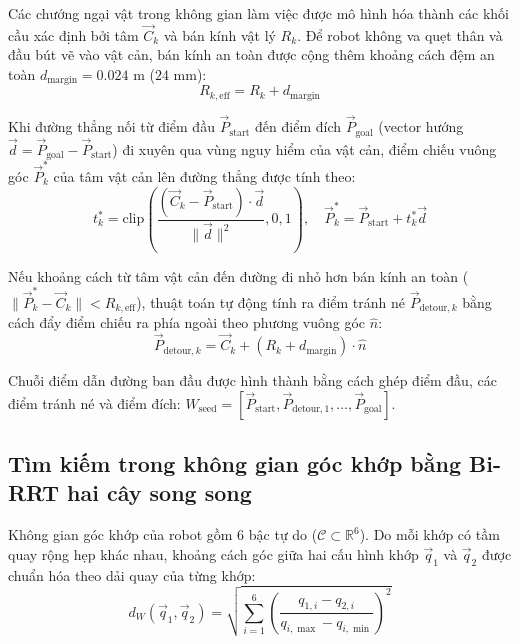 Các chướng ngại vật trong không gian làm việc được mô hình hóa thành các khối cầu xác định bởi tâm $\vec{C}_k$ và bán kính vật lý $R_k$. Để robot không va quẹt thân và đầu bút vẽ vào vật cản, bán kính an toàn được cộng thêm khoảng cách đệm an toàn $d_{\text{margin}} = 0.024\text{ m}$ ($24\text{ mm}$):
\begin{equation}
    R_{k,\text{eff}} = R_k + d_{\text{margin}}
\end{equation}

Khi đường thẳng nối từ điểm đầu $\vec{P}_{\text{start}}$ đến điểm đích $\vec{P}_{\text{goal}}$ (vector hướng $\vec{d} = \vec{P}_{\text{goal}} - \vec{P}_{\text{start}}$) đi xuyên qua vùng nguy hiểm của vật cản, điểm chiếu vuông góc $\vec{P}_k^*$ của tâm vật cản lên đường thẳng được tính theo:
\begin{equation}
    t_k^* = \text{clip}\left( \frac{(\vec{C}_k - \vec{P}_{\text{start}}) \cdot \vec{d}}{\|\vec{d}\|^2}, 0, 1 \right), \quad \vec{P}_k^* = \vec{P}_{\text{start}} + t_k^* \vec{d}
\end{equation}

Nếu khoảng cách từ tâm vật cản đến đường đi nhỏ hơn bán kính an toàn ($\|\vec{P}_k^* - \vec{C}_k\| < R_{k,\text{eff}}$), thuật toán tự động tính ra điểm tránh né $\vec{P}_{\text{detour},k}$ bằng cách đẩy điểm chiếu ra phía ngoài theo phương vuông góc $\hat{n}$:
\begin{equation}
    \vec{P}_{\text{detour},k} = \vec{C}_k + (R_k + d_{\text{margin}}) \cdot \hat{n}
\end{equation}

Chuỗi điểm dẫn đường ban đầu được hình thành bằng cách ghép điểm đầu, các điểm tránh né và điểm đích: $W_{\text{seed}} = [\vec{P}_{\text{start}}, \vec{P}_{\text{detour},1}, \dots, \vec{P}_{\text{goal}}]$.

\subsection{Tìm kiếm trong không gian góc khớp bằng Bi-RRT hai cây song song}

Không gian góc khớp của robot gồm 6 bậc tự do ($\mathcal{C} \subset \mathbb{R}^6$). Do mỗi khớp có tầm quay rộng hẹp khác nhau, khoảng cách góc giữa hai cấu hình khớp $\vec{q}_1$ và $\vec{q}_2$ được chuẩn hóa theo dải quay của từng khớp:
\begin{equation}
    d_W(\vec{q}_1, \vec{q}_2) = \sqrt{ \sum_{i=1}^6 \left( \frac{q_{1,i} - q_{2,i}}{q_{i,\max} - q_{i,\min}} \right)^2 }
\end{equation}

